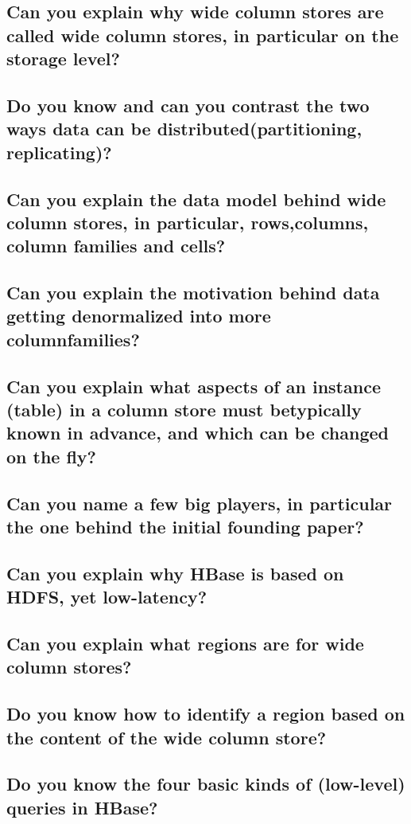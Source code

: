 \documentclass{article}
\begin{document}
\subsection{Can you explain why wide column stores are called wide column stores, in particular on the storage level?}
\subsection{Do you know and can you contrast the two ways data can be distributed(partitioning, replicating)?}
\subsection{Can you explain the data model behind wide column stores, in particular, rows,columns, column families and cells?}
\subsection{Can you explain the motivation behind data getting denormalized into more columnfamilies?}
\subsection{Can you explain what aspects of an instance (table) in a column store must betypically known in advance, and which can be changed on the fly?}
\subsection{Can you name a few big players, in particular the one behind the initial founding paper?}
\subsection{Can you explain why HBase is based on HDFS, yet low-latency?}
\subsection{Can you explain what regions are for wide column stores?}
\subsection{Do you know how to identify a region based on the content of the wide column store?}
\subsection{Do you know the four basic kinds of (low-level) queries in HBase?}
\end{document}
